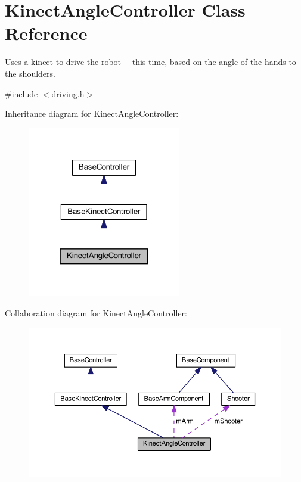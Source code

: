 \hypertarget{class_kinect_angle_controller}{\section{\-Kinect\-Angle\-Controller \-Class \-Reference}
\label{class_kinect_angle_controller}
}


\-Uses a kinect to drive the robot -\/-\/ this time, based on the angle of the hands to the shoulders.  




{\ttfamily \#include $<$driving.\-h$>$}



\-Inheritance diagram for \-Kinect\-Angle\-Controller\-:\nopagebreak
\begin{figure}[H]
\begin{center}
\leavevmode
\includegraphics[width=190pt]{class_kinect_angle_controller__inherit__graph}
\end{center}
\end{figure}


\-Collaboration diagram for \-Kinect\-Angle\-Controller\-:\nopagebreak
\begin{figure}[H]
\begin{center}
\leavevmode
\includegraphics[width=350pt]{class_kinect_angle_controller__coll__graph}
\end{center}
\end{figure}
